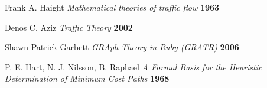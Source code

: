 \documentclass[11pt,a4paper]{article}
\begin{document}
\begin{thebibliography}{99}
 Frank A. Haight
{\it Mathematical theories of traffic flow} {\bf 1963}

 Denos C. Aziz
{\it Traffic Theory} {\bf 2002}

 Shawn Patrick Garbett
{\it GRAph Theory in Ruby (GRATR)} {\bf 2006}

 P. E. Hart, N. J. Nilsson, B. Raphael
{\it A Formal Basis for the Heuristic Determination of Minimum Cost Paths} {\bf 1968}

\end{thebibliography}
\end{document}
